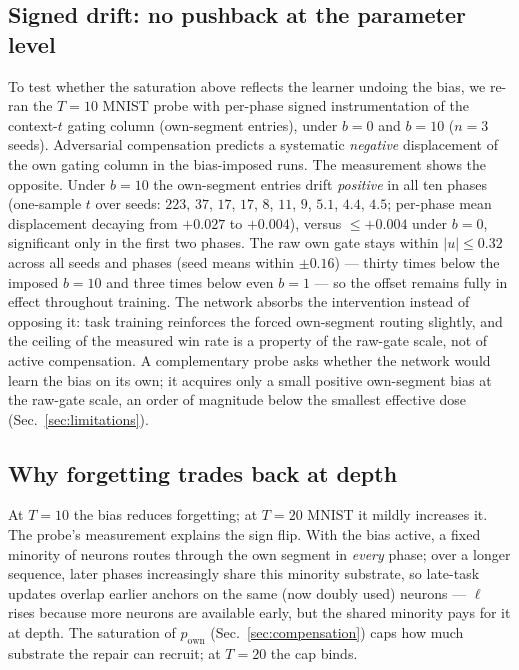 \documentclass[review,12pt,number]{elsarticle}
\newcommand{\own}{p_{\mathrm{own}}}
\begin{document}
\subsection{Signed drift: no pushback at the parameter level}
\label{sec:sigdrift}

To test whether the saturation above reflects the learner undoing the
bias, we re-ran the $T{=}10$ MNIST probe with per-phase signed
instrumentation of the context-$t$ gating column (own-segment entries),
under $b{=}0$ and $b{=}10$ ($n{=}3$ seeds). Adversarial compensation
predicts a systematic \emph{negative} displacement of the own gating
column in the bias-imposed runs. The measurement shows the opposite.
Under $b{=}10$ the own-segment entries drift \emph{positive} in all ten
phases (one-sample $t$ over seeds: $223$, $37$, $17$, $17$, $8$, $11$,
$9$, $5.1$, $4.4$, $4.5$; per-phase mean displacement decaying from
$+0.027$ to $+0.004$), versus $\le +0.004$ under $b{=}0$, significant
only in the first two phases. The raw own gate stays within
$|u| \le 0.32$ across all seeds and phases (seed means within
$\pm 0.16$) --- thirty times below the imposed $b{=}10$ and three times
below even $b{=}1$ --- so the offset remains fully in effect throughout
training. The network absorbs the intervention instead of opposing it:
task training reinforces the forced own-segment routing slightly, and
the ceiling of the measured win rate is a property of the raw-gate
scale, not of active compensation. A complementary probe asks whether
the network would learn the bias on its own; it acquires only a small
positive own-segment bias at the raw-gate scale, an order of magnitude
below the smallest effective dose (Sec.~\ref{sec:limitations}).

\subsection{Why forgetting trades back at depth}
\label{sec:depthbwt}

At $T{=}10$ the bias reduces forgetting; at $T{=}20$ MNIST it mildly
increases it. The probe's measurement explains the sign flip. With the
bias active, a fixed minority of neurons routes through the own segment in
\emph{every} phase; over a longer sequence, later phases increasingly
share this minority substrate, so late-task updates overlap earlier
anchors on the same (now doubly used) neurons --- $\ell$ rises because
more neurons are available early, but the shared minority pays for it at
depth. The saturation of $\own$ (Sec.~\ref{sec:compensation}) caps how
much substrate the repair can recruit; at $T{=}20$ the cap binds.
\end{document}
